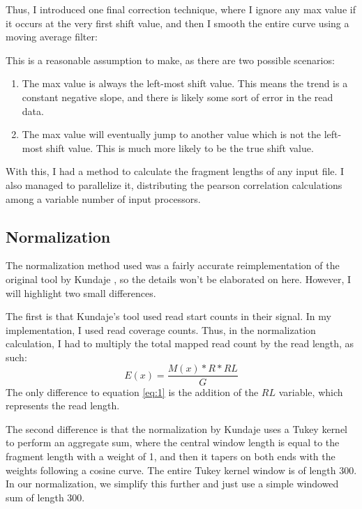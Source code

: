 \documentclass[a4paper]{article}
\begin{document}
    Thus, I introduced one final correction technique, where I ignore any max value if it occurs at the very first
    shift value, and then I smooth the entire curve using a moving average filter:
    
    This is a reasonable assumption to make, as there are two possible scenarios:
    \begin{enumerate}
      \item The max value is always the left-most shift value. This means the trend is a constant negative slope, and
            there is likely some sort of error in the read data.
      \item The max value will eventually jump to another value which is not the left-most shift value. This is much
            more likely to be the true shift value.
    \end{enumerate}
    With this, I had a method to calculate the fragment lengths of any input file. I also managed to parallelize it,
    distributing the pearson correlation calculations among a variable number of input processors.

    \subsection{Normalization}
    \label{methods:normalization}
    The normalization method used was a fairly accurate reimplementation of the original tool by Kundaje \cite{hoffman_integrative_2013}, so
    the details won't be elaborated on here. However, I will highlight two small differences.

    The first is that Kundaje's tool used read start counts in their signal. In my implementation, I used read
    coverage counts. Thus, in the normalization calculation, I had to multiply the total mapped read count by the read
    length, as such:
    \begin{equation}
      \label{eq:3}
      E(x) = \frac{M(x)*R*RL}{G}
    \end{equation}
    The only difference to equation \ref{eq:1} is the addition of the $RL$ variable, which represents the read length.

    The second difference is that the normalization by Kundaje uses a Tukey kernel to perform an aggregate sum,
    where the central window length is equal to the fragment length with a weight of 1, and then it tapers on both ends
    with the weights following a cosine curve. The entire Tukey kernel window is of length 300. In our normalization,
    we simplify this further and just use a simple windowed sum of length 300.
\end{document}
